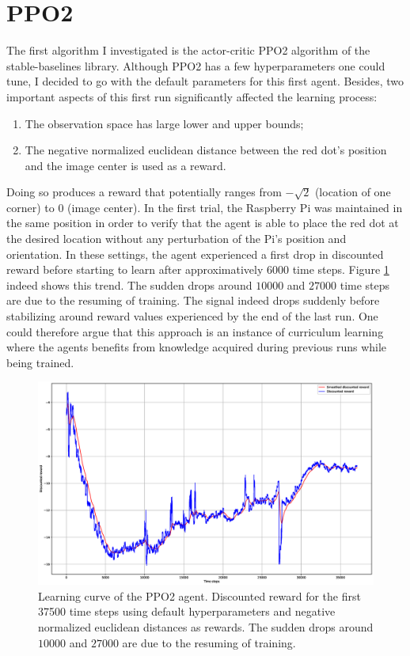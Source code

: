 \section{PPO2}

The first algorithm I investigated is the actor-critic PPO2 algorithm of the stable-baselines library. Although PPO2 has a few hyperparameters one could tune, I decided to go with the default parameters for this first agent. Besides,  two important aspects of this first run significantly affected the learning process:

\begin{enumerate}
	\item The observation space has large lower and upper bounds;
	\item The negative normalized euclidean distance between the red dot's position and the image center is used as a reward.
\end{enumerate}

Doing so produces a reward that potentially ranges from $-\sqrt{2}$ (location of one corner) to $0$ (image center). In the first trial, the Raspberry Pi was maintained in the same position in order to verify that the agent is able to place the red dot at the desired location without any perturbation of the Pi's position and orientation. In these settings, the agent experienced a first drop in discounted reward before starting to learn after approximatively $6000$ time steps.  Figure \ref{reward_dist} indeed shows this trend. The sudden drops around $10000$ and $27000$ time steps are due to the resuming of training. The signal indeed drops suddenly before stabilizing around reward values experienced by the end of the last run. One could therefore argue that this approach is an instance of curriculum learning where the agents benefits from knowledge acquired during previous runs while being trained.

\begin{figure}[H]
	\centering
	\includegraphics[scale=0.2]{Images/ppo2_1.eps}
	\caption{Learning curve of the PPO2 agent.  Discounted reward for the first 37500 time steps using default hyperparameters and negative normalized euclidean distances as rewards. The sudden drops around $10000$ and $27000$ are due to the resuming of training.}
	\label{reward_dist}
\end{figure}

